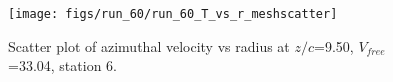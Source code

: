 \begin{figure}[H]
\centering
\texttt{[image: figs/run\_60/run\_60\_T\_vs\_r\_meshscatter]}
\caption{Scatter plot of azimuthal velocity vs radius at $z/c$=9.50, $V_{free}$=33.04, station 6.}
\label{fig:run_60_T_vs_r_meshscatter}
\end{figure}


